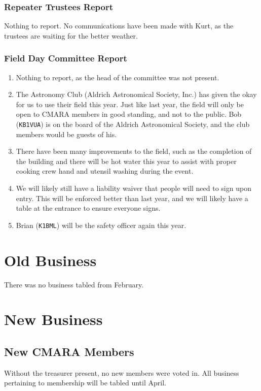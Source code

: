 \documentclass[10pt,letterpaper]{article}
\begin{document}
\subsubsection{Repeater Trustees Report}
Nothing to report. No communications have been made with Kurt, as the trustees are waiting for the better weather.

\subsubsection{Field Day Committee Report}
\begin{enumerate}
  \item Nothing to report, as the head of the committee was not present.
  \item The Astronomy Club (Aldrich Astronomical Society, Inc.) has given the okay for us to use their field this year. Just like last year, the field will only be open to CMARA members in good standing, and not to the public. Bob (\texttt{KB1VUA}) is on the board of the Aldrich Astronomical Society, and the club members would be guests of his.
  \item There have been many improvements to the field, such as the completion of the building and there will be hot water this year to assist with proper cooking crew hand and utensil washing during the event.
  \item We will likely still have a liability waiver that people will need to sign upon entry. This will be enforced better than last year, and we will likely have a table at the entrance to ensure everyone signs.
  \item Brian (\texttt{K1BML}) will be the safety officer again this year.
\end{enumerate}

\section{Old Business}
There was no business tabled from February.

\section{New Business}

\subsection{New CMARA Members}
\label{new-cmara-members}

Without the treasurer present, no new members were voted in. All business pertaining to membership will be tabled until April.
\end{document}
